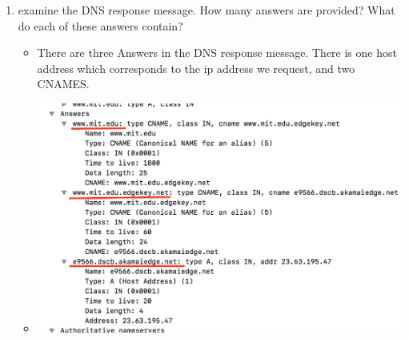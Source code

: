 \documentclass{article}
\begin{document}
\begin{itemize}
\begin{enumerate}
    \item examine the DNS response message.  How many answers are provided?  What do each of these answers contain?
      \begin{itemize}
        \item There are three Answers in the DNS response message.  There is one host address which corresponds to the ip address we request, and two CNAMES.
        \item \includegraphics[scale=0.5]{images/DNS14.png}
      \end{itemize}



\end{enumerate}
\end{itemize}
\end{document}

